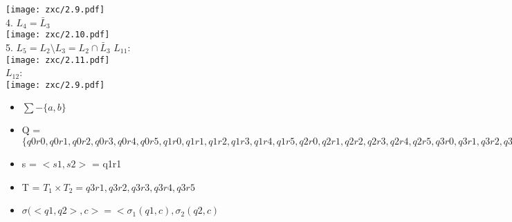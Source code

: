 \documentclass{article}
\begin{document}
  \texttt{[image: zxc/2.9.pdf]}\\
  4. $L_4 = \bar L_3$\\
    \texttt{[image: zxc/2.10.pdf]}\\
  5. $L_5 = L_2\setminus L_3 = L_2\cap \bar L_3$
  $L_{11}$:\\
    \texttt{[image: zxc/2.11.pdf]}\\
    $L_{12}$:\\
      \texttt{[image: zxc/2.9.pdf]}\\
  \begin{itemize}
      \item $\sum - \{a,b\}$\\
      \item Q = $\{q0r0,q0r1,q0r2,q0r3,q0r4,q0r5,q1r0,q1r1,q1r2,q1r3,q1r4,q1r5,q2r0,q2r1,q2r2,q2r3,q2r4,q2r5,q3r0,q3r1,q3r2,q3r3,q3r4,q3r5,q4r0,q4r1,q4r2,q4r3,q4r4,q4r5\}$\\
      \item s = $<s1,s2>$ = q1r1\\
      \item T = $T_1 \times T_2 = q3r1,q3r2,q3r3,q3r4,q3r5 $\\
      \item $\sigma(<q1,q2>,c> =  < \sigma_1(q1,c),\sigma_2(q2,c)$\\
  \end{itemize}
\end{document}
